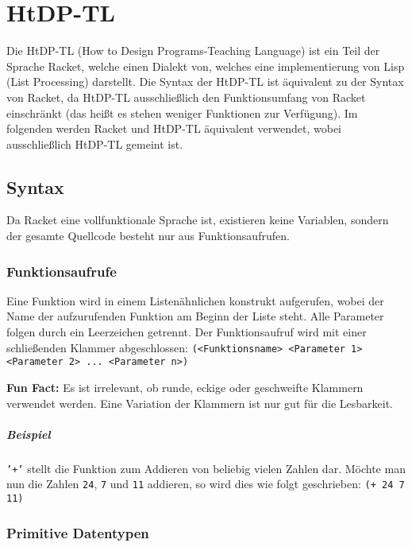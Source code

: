 


\chapter{HtDP-TL}
	Die HtDP-TL (How to Design Programs-Teaching Language) ist ein Teil der Sprache Racket, welche einen Dialekt von, welches eine implementierung von Lisp (List Processing) darstellt. Die Syntax der HtDP-TL ist äquivalent zu der Syntax von Racket, da HtDP-TL ausschließlich den Funktionsumfang von Racket einschränkt (das heißt es stehen weniger Funktionen zur Verfügung). Im folgenden werden Racket und HtDP-TL äquivalent verwendet, wobei ausschließlich HtDP-TL gemeint ist.

	\section{Syntax}
		Da Racket eine vollfunktionale Sprache ist, existieren keine Variablen, sondern der gesamte Quellcode besteht nur aus Funktionsaufrufen.

		\subsection{Funktionsaufrufe}
			Eine Funktion wird in einem Listenähnlichen konstrukt aufgerufen, wobei der Name der aufzurufenden Funktion am Beginn der Liste steht. Alle Parameter folgen durch ein Leerzeichen getrennt. Der Funktionsaufruf wird mit einer schließenden Klammer abgeschlossen: \texttt{(<Funktionsname> <Parameter 1> <Parameter 2> ... <Parameter n>)}

			\textbf{Fun Fact:} Es ist irrelevant, ob runde, eckige oder geschweifte Klammern verwendet werden. Eine Variation der Klammern ist nur gut für die Lesbarkeit.

			\paragraph{Beispiel}
				\texttt{'+'} stellt die Funktion zum Addieren von beliebig vielen Zahlen dar. Möchte man nun die Zahlen \texttt{24}, \texttt{7} und \texttt{11} addieren, so wird dies wie folgt geschrieben: \texttt{(+ 24 7 11)}



		\subsection{Primitive Datentypen}
